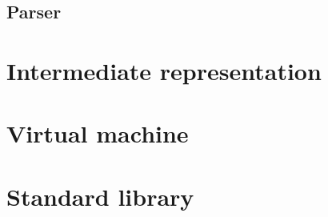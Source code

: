 \documentclass[10pt,a4paper]{article}
\begin{document}
\subsection{Parser}

\pagebreak

\section{Intermediate representation}

\pagebreak

\section{Virtual machine}

\pagebreak

\section{Standard library}
\end{document}
